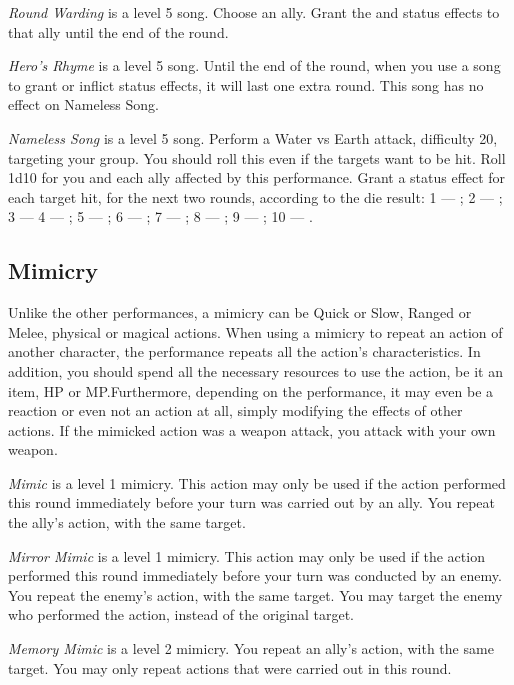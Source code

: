 \begin{multicols}{2}
    \textit{Round Warding} is a level 5 song. Choose an ally. Grant the  and  status effects to that ally until the end of the round.
    
	\textit{Hero's Rhyme} is a level 5 song. Until the end of the round, when you use a song to grant or inflict status effects, it will last one extra round. This song has no effect on Nameless Song.
    
    \textit{Nameless Song} is a level 5 song. Perform a Water vs Earth attack, difficulty 20, targeting your group. You should roll this even if the targets want to be hit. Roll 1d10 for you and each ally affected by this performance. Grant a status effect for each target hit, for the next two rounds, according to the die result: 1 --- ; 2 --- ; 3 ---  4 --- ; 5 --- ; 6 --- ; 7 --- ; 8 --- ; 9 --- ; 10 --- .
 
    \subsection{Mimicry}\label{subsec:perf-mimicry}

	Unlike the other performances, a mimicry can be Quick or Slow, Ranged or Melee, physical or magical actions. When using a mimicry to repeat an action of another character, the performance repeats all the action’s characteristics. In addition, you should spend all the necessary resources to use the action, be it an item, HP or MP.\@{}Furthermore, depending on the performance, it may even be a reaction or even not an action at all, simply modifying the effects of other actions. If the mimicked action was a weapon attack, you attack with your own weapon.
    
    \textit{Mimic} is a level 1 mimicry. This action may only be used if the action performed this round immediately before your turn was carried out by an ally. You repeat the ally’s action, with the same target.
    
    \textit{Mirror Mimic} is a level 1 mimicry. This action may only be used if the action performed this round immediately before your turn was conducted by an enemy. You repeat the enemy’s action, with the same target. You may target the enemy who performed the action, instead of the original target.
    
    \textit{Memory Mimic} is a level 2 mimicry. You repeat an ally’s action, with the same target. You may only repeat actions that were carried out in this round.


\end{multicols}
